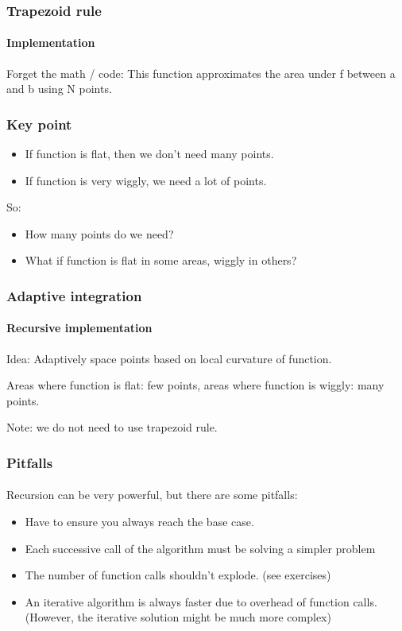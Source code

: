 \begin{frame}\frametitle{Trapezoid rule}
    \framesubtitle{Implementation}


    Forget the math / code:
    This function approximates the area under f between a and b using N points.

\end{frame}

\begin{frame}\frametitle{Key point}

    \begin{itemize}
        \item If function is flat, then we don't need many points.
        \item If function is very wiggly, we need a lot of points.
    \end{itemize}

    So:

    \begin{itemize}
        \item How many points do we need?
        \item What if function is flat in some areas, wiggly in others?
    \end{itemize}

\end{frame}

\begin{frame}\frametitle{Adaptive integration}
    \framesubtitle{Recursive implementation}

    Idea: Adaptively space points based on local curvature of function.

    Areas where function is flat: few points, areas where function is wiggly: many points.

    \pause


    Note: we do not need to use trapezoid rule.

\end{frame}

\begin{frame}\frametitle{Pitfalls}
    \framesubtitle{}

    Recursion can be very powerful, but there are some pitfalls:

    \begin{itemize}
        \item Have to ensure you always reach the base case.
        \item Each successive call of the algorithm must be solving a simpler problem
        \item The number of function calls shouldn't explode. (see exercises)
        \item An iterative algorithm is always faster due to overhead of function calls.
         (However, the iterative solution might be much more complex)
    \end{itemize}

\end{frame}



